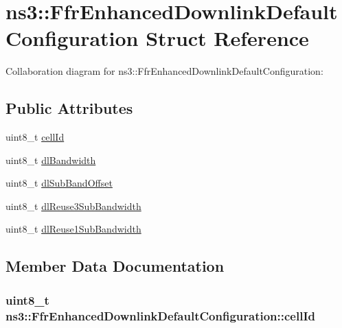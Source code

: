 \hypertarget{structns3_1_1FfrEnhancedDownlinkDefaultConfiguration}{}\section{ns3\+:\+:Ffr\+Enhanced\+Downlink\+Default\+Configuration Struct Reference}
\label{structns3_1_1FfrEnhancedDownlinkDefaultConfiguration}


Collaboration diagram for ns3\+:\+:Ffr\+Enhanced\+Downlink\+Default\+Configuration\+:
\subsection*{Public Attributes}
\begin{DoxyCompactItemize}
\item 
uint8\+\_\+t \hyperlink{structns3_1_1FfrEnhancedDownlinkDefaultConfiguration_a5c5cc2bd21f3138a16c7b44a1f65d493}{cell\+Id}
\item 
uint8\+\_\+t \hyperlink{structns3_1_1FfrEnhancedDownlinkDefaultConfiguration_a842a0b3d48c5365c77f6470b4447dde2}{dl\+Bandwidth}
\item 
uint8\+\_\+t \hyperlink{structns3_1_1FfrEnhancedDownlinkDefaultConfiguration_adcb873363c6ccc3cd6f679af003f286a}{dl\+Sub\+Band\+Offset}
\item 
uint8\+\_\+t \hyperlink{structns3_1_1FfrEnhancedDownlinkDefaultConfiguration_aec2ebdba5313e2eb0e6c857b2c415223}{dl\+Reuse3\+Sub\+Bandwidth}
\item 
uint8\+\_\+t \hyperlink{structns3_1_1FfrEnhancedDownlinkDefaultConfiguration_a0ab7d5f1d53a97a41b0c6159c497e5c4}{dl\+Reuse1\+Sub\+Bandwidth}
\end{DoxyCompactItemize}


\subsection{Member Data Documentation}
\subsubsection[{\texorpdfstring{cell\+Id}{cellId}}]{\setlength{\rightskip}{0pt plus 5cm}uint8\+\_\+t ns3\+::\+Ffr\+Enhanced\+Downlink\+Default\+Configuration\+::cell\+Id}\hypertarget{structns3_1_1FfrEnhancedDownlinkDefaultConfiguration_a5c5cc2bd21f3138a16c7b44a1f65d493}{}\label{structns3_1_1FfrEnhancedDownlinkDefaultConfiguration_a5c5cc2bd21f3138a16c7b44a1f65d493}
